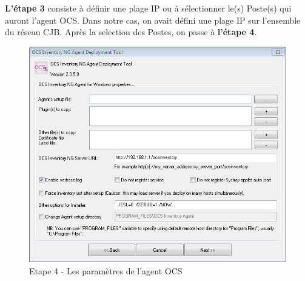 \documentclass[11pt,a4paper,oneside]{article}
\begin{document}
\textbf{L'étape 3} consiste à définir une plage IP  ou à sélectionner le(s) Poste(s) qui auront l'agent OCS. Dans notre cas, on avait défini une plage IP sur l'ensemble du réseau CJB. Après la selection des Postes, on passe à \textbf{l'étape 4}.
\newpage

\begin{figure}[hbtp]
\centering
\includegraphics[scale=0.7]{Script/4.png}
\caption{Etape 4 - Les paramètres de l'agent OCS}
\end{figure}
\end{document}
